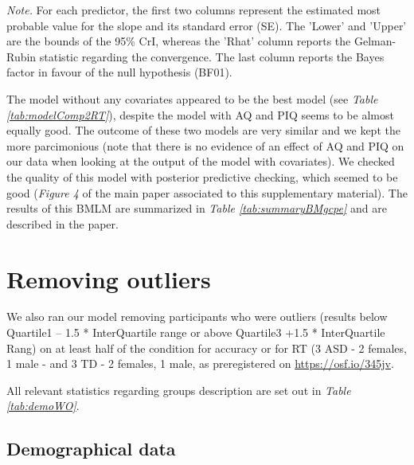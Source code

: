 \documentclass[
  11pt,
  english,
  ,doc,floatsintext]{apa6}
\begin{document}
\begin{table}[htb]
\begin{center}
\begin{threeparttable}
\begin{tablenotes}[para]
\normalsize{\textit{Note.} For each predictor, the first two columns represent the estimated
    most probable value for the slope and its standard error (SE). The 'Lower' and 'Upper' are the bounds of the 95\% CrI, whereas the 'Rhat' column reports the Gelman-Rubin statistic regarding the convergence. The last column reports the Bayes factor in favour of the null hypothesis (BF01).}
\end{tablenotes}

\end{threeparttable}
\end{center}

\end{table}

The model without any covariates appeared to be the best model (see \emph{Table \ref{tab:modelComp2RT}}), despite the model with AQ and PIQ seems to be almost equally good. The outcome of these two models are very similar and we kept the more parcimonious (note that there is no evidence of an effect of AQ and PIQ on our data when looking at the output of the model with covariates).
We checked the quality of this model with posterior predictive checking, which seemed to be good (\emph{Figure 4} of the main paper associated to this supplementary material). The results of this BMLM are summarized in \emph{Table \ref{tab:summaryBMgcpe}} and are described in the paper.

\newpage

\hypertarget{removing-outliers}{%
\section{Removing outliers}\label{removing-outliers}}

We also ran our model removing participants who were outliers (results below Quartile1 -- 1.5 * InterQuartile range or above Quartile3 +1.5 * InterQuartile Rang) on at least half of the condition for accuracy or for RT (3 ASD - 2 females, 1 male - and 3 TD - 2 females, 1 male, as preregistered on \url{https://osf.io/345jv}.

All relevant statistics regarding groups description are set out in \emph{Table \ref{tab:demoWO}}.

\hypertarget{demographical-data}{%
\subsection{Demographical data}\label{demographical-data}}
\end{document}
